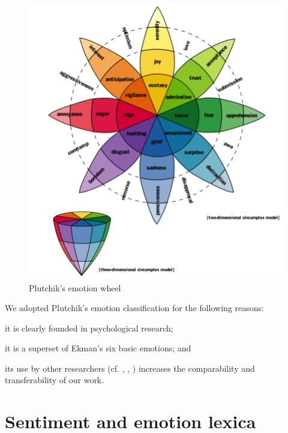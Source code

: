 \begin{figure}[bth]
\includegraphics[width=.80\linewidth]{gfx/plutchik_wheel_emotion.png}
\caption{Plutchik's emotion wheel}\label{fig:plutchik}
\end{figure}

We adopted Plutchik's emotion classification for the following reasons: \begin{inparaenum} \item it is clearly founded in psychological research; \item it is a superset of Ekman's six basic emotions; and \item its use by other researchers (cf. \cite{nrc}, \cite{adjective_noun_pairs}, \cite{emotions_novels_fairy_tales}) increases the comparability and transferability of our work.
\end{inparaenum}

\section{Sentiment and emotion lexica}

